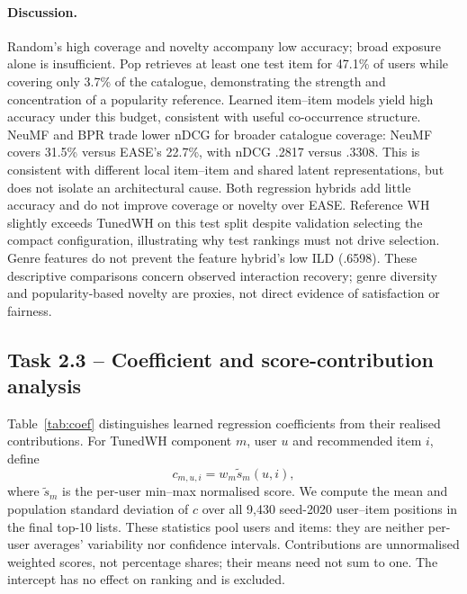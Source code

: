 \documentclass[12pt,a4paper]{article}   %
\begin{document}
\paragraph{Discussion.}
Random's high coverage and novelty accompany low accuracy; broad exposure alone is insufficient. Pop retrieves at least one test item for 47.1\% of users while covering only 3.7\% of the catalogue, demonstrating the strength and concentration of a popularity reference. Learned item--item models yield high accuracy under this budget, consistent with useful co-occurrence structure. NeuMF and BPR trade lower nDCG for broader catalogue coverage: NeuMF covers 31.5\% versus EASE's 22.7\%, with nDCG .2817 versus .3308. This is consistent with different local item--item and shared latent representations, but does not isolate an architectural cause. Both regression hybrids add little accuracy and do not improve coverage or novelty over EASE. Reference WH slightly exceeds TunedWH on this test split despite validation selecting the compact configuration, illustrating why test rankings must not drive selection. Genre features do not prevent the feature hybrid's low ILD (.6598). These descriptive comparisons concern observed interaction recovery; genre diversity and popularity-based novelty are proxies, not direct evidence of satisfaction or fairness.

\clearpage
\subsection{Task 2.3 -- Coefficient and score-contribution analysis}

Table~\ref{tab:coef} distinguishes learned regression coefficients from their realised contributions. For TunedWH component $m$, user $u$ and recommended item $i$, define
\[
c_{m,u,i}=w_m\widetilde{s}_m(u,i),
\]
where $\widetilde{s}_m$ is the per-user min--max normalised score. We compute the mean and population standard deviation of $c$ over all 9,430 seed-2020 user--item positions in the final top-10 lists. These statistics pool users and items: they are neither per-user averages' variability nor confidence intervals. Contributions are unnormalised weighted scores, not percentage shares; their means need not sum to one. The intercept has no effect on ranking and is excluded.
\end{document}
